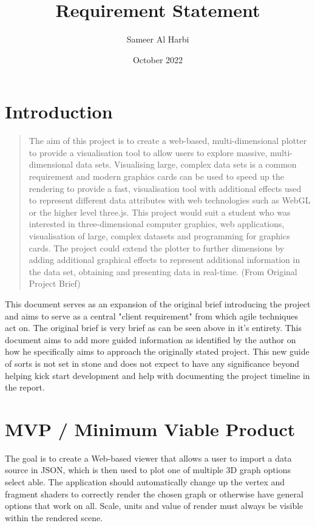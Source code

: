 \documentclass{article}
\title{Requirement Statement}
\author{Sameer Al Harbi}
\date{October 2022}
\begin{document}
\maketitle

\section{Introduction}
\begin{quote}
The aim of this project is to create a web-based, multi-dimensional plotter to provide 
a visualisation tool to allow users to explore massive, multi-dimensional data sets. 
Visualising large, complex data sets is a common requirement and modern graphics 
cards can be used to speed up the rendering to provide a fast, visualisation tool with 
additional effects used to represent different data attributes with web technologies 
such as WebGL or the higher level three.js. This project would suit a student who 
was interested in three-dimensional computer graphics, web applications, 
visualisation of large, complex datasets and programming for graphics cards. The 
project could extend the plotter to further dimensions by adding additional graphical 
effects to represent additional information in the data set, obtaining and presenting 
data in real-time. (From Original Project Brief)
\end{quote}

This document serves as an expansion of the original brief introducing the project and aims to serve as a central "client requirement" from which agile techniques act on. The original brief is very brief as can be seen above in it's entirety. This document aims to add more guided information as identified by the author on how he specifically aims to approach the originally stated project. This new guide of sorts is not set in stone and does not expect to have any significance beyond helping kick start development and help with documenting the project timeline in the report. 

\section{MVP / Minimum Viable Product}

The goal is to create a Web-based viewer that allows a user to import a data source in JSON, which is then used to plot one of multiple 3D graph options select able. 
The application should automatically change up the vertex and fragment shaders to correctly render the chosen graph or otherwise have general options that work on all. Scale, units and value of render must always be visible within the rendered scene.
\end{document}
